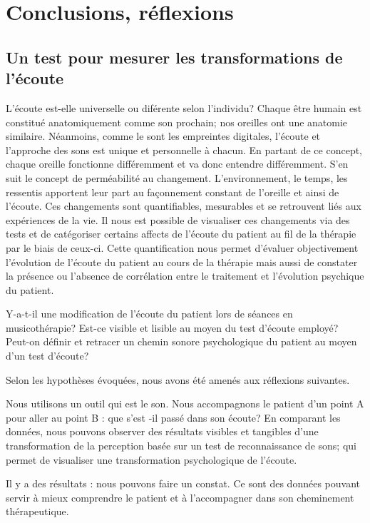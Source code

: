 
\chapter{Conclusions, réflexions}

 
\section{Un test pour mesurer les trans\-for\-ma\-tions de l'écoute}

L'écoute est-elle universelle ou diférente selon l'individu?
 Chaque être humain est constitué anatomiquement comme son prochain;
 nos oreilles ont  une anatomie similaire. Néanmoins, comme le sont 
les empreintes digitales, l'écoute et l'approche des sons est unique
et personnelle à chacun. En partant de ce concept, chaque oreille
fonctionne différemment et va donc entendre différemment. S'en suit le concept de perméabilité au
changement. L'environnement, le temps, les ressentis apportent leur
part au façonnement constant de l'oreille et ainsi de l'écoute. Ces
changements sont quantifiables, mesurables et se retrouvent liés aux
expériences de la vie. Il nous est possible de visualiser ces
changements via des tests et de catégoriser certains affects de
l'écoute du patient au fil de la thérapie par le biais de
ceux-ci. Cette quantification nous permet d'évaluer objectivement
l'évolution de l'écoute du patient au cours de la thérapie  mais aussi
de constater la présence ou l'absence de corrélation entre le
traitement et l'évolution psychique du patient.

Y-a-t-il une modification de l'écoute du patient lors de séances en musicothérapie?
Est-ce visible et lisible au moyen du test d'écoute employé?
Peut-on définir et retracer un chemin sonore psychologique du patient au moyen d'un test d'écoute?


Selon les hypothèses évoquées, nous avons été amenés aux réflexions suivantes.

Nous utilisons un outil qui est le son. Nous accompagnons
le patient d'un point A pour aller au point B : que s'est -il passé
dans son écoute?
En comparant les données, nous pouvons observer des résultats visibles et tangibles 
d'une transformation de la
perception basée sur un test de reconnaissance de sons;  qui permet de visualiser une transformation psychologique
de l'écoute. 


Il y a des résultats : nous pouvons faire un constat.
Ce sont des données pouvant servir à mieux comprendre le patient
et à l'accompagner dans son cheminement thérapeutique.



